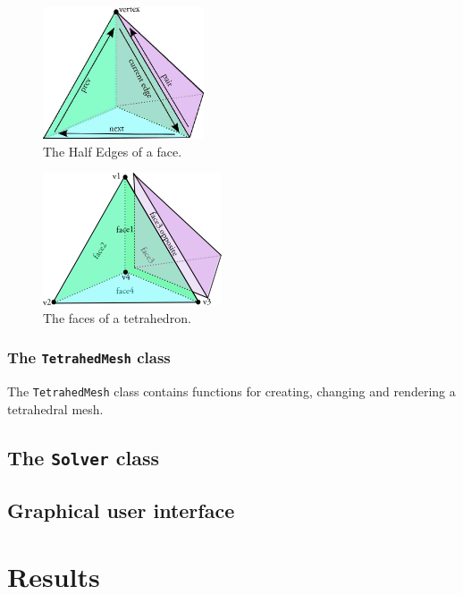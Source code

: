 \documentclass[10pt,a4paper]{article}
\begin{document}
\begin{figure}[htbp]
\label{fig:tetraedge}
\begin{center}
\includegraphics[scale=1]{figures/tetra_edge}
\caption{The Half Edges of a face.}
\end{center}
\end{figure}

\begin{figure}[htbp]
\label{fig:tetraface}
\begin{center}
\includegraphics[scale=1]{figures/tetra_face}
\caption{The faces of a tetrahedron.}
\end{center}
\end{figure}


\subsubsection{The \texttt{TetrahedMesh} class}
The \texttt{TetrahedMesh} class contains functions for creating, changing and rendering a tetrahedral mesh.

\subsection{The \texttt{Solver} class}



\subsection{Graphical user interface}



\section{Results}
\end{document}
